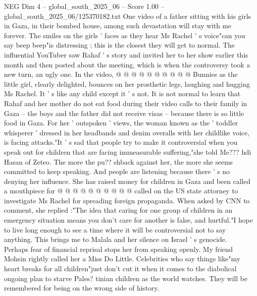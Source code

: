 \begin{textsample}{NEG Dim 4 – global\_south\_2025\_06 – Score 1.00 – global\_south\_2025\_06/125370182.txt}
One video of a father sitting with his girls in Gaza, in their bombed house, among such devastation will stay with me forever.
The smiles on the girls ' faces as they hear Ms Rachel ' s voice"can you say beep beep"is distressing ; this is the closest they will get to normal.
The influential YouTuber saw Rahaf ' s story and invited her to her show earlier this month and then posted about the meeting, which is when the controversy took a new turn, an ugly one.
In the video, @ @ @ @ @ @ @ @ @ @ Bunnies as the little girl, clearly delighted, bounces on her prosthetic legs, laughing and hugging Ms Rachel.
It ' s like any child except it ' s not.
It is not normal to learn that Rahaf and her mother do not eat food during their video calls to their family in Gaza -- the boys and the father did not receive visas -- because there is so little food in Gaza.
For her ' outspoken ' views, the woman known as the ' toddler whisperer ' dressed in her headbands and denim overalls with her childlike voice, is facing attacks."It ' s sad that people try to make it controversial when you speak out for children that are facing immeasurable suffering,"she told Me??? hdi Hasan of Zeteo.
The more the pu?? shback against her, the more she seems committed to keep speaking.
And people are listening because there ' s no denying her influence.
She has raised money for children in Gaza and been called a mouthpiece for @ @ @ @ @ @ @ @ @ @ called on the US state attorney to investigate Ms Rachel for spreading foreign propaganda.
When asked by CNN to comment, she replied :"The idea that caring for one group of children in an emergency situation means you don't care for another is false, and hurtful."I hope to live long enough to see a time where it will be controversial not to say anything.
This brings me to Malala and her silence on Israel ' s genocide.
Perhaps fear of financial reprisal stops her from speaking openly.
My friend Mohsin rightly called her a Miss Do Little.
Celebrities who say things like"my heart breaks for all children"just don't cut it when it comes to the diabolical ongoing plan to starve Pales? tinian children as the world watches.
They will be remembered for being on the wrong side of history.

\end{textsample}

